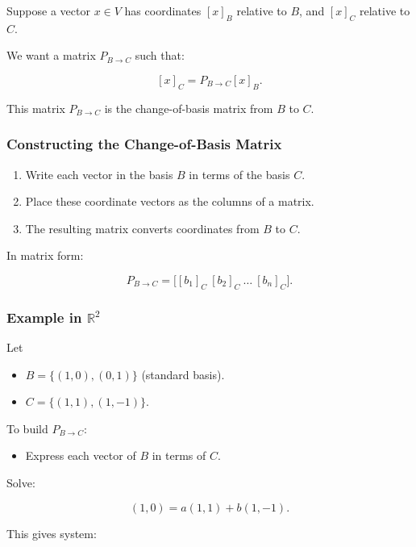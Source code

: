 \documentclass[
  letterpaper,
  DIV=11,
  numbers=noendperiod]{scrreprt}
\providecommand{\tightlist}{%
  \setlength{\itemsep}{0pt}\setlength{\parskip}{0pt}}
\begin{document}
Suppose a vector \(x \in V\) has coordinates \([x]_B\) relative to
\(B\), and \([x]_C\) relative to \(C\).

We want a matrix \(P_{B \to C}\) such that:

\[
[x]_C = P_{B \to C} [x]_B.
\]

This matrix \(P_{B \to C}\) is the change-of-basis matrix from \(B\) to
\(C\).

\subsubsection{Constructing the Change-of-Basis
Matrix}\label{constructing-the-change-of-basis-matrix}

\begin{enumerate}
\def\labelenumi{\arabic{enumi}.}
\tightlist
\item
  Write each vector in the basis \(B\) in terms of the basis \(C\).
\item
  Place these coordinate vectors as the columns of a matrix.
\item
  The resulting matrix converts coordinates from \(B\) to \(C\).
\end{enumerate}

In matrix form:

\[
P_{B \to C} = \big[ [b_1]_C \ [b_2]_C \ \dots \ [b_n]_C \big].
\]

\subsubsection{\texorpdfstring{Example in
\(\mathbb{R}^2\)}{Example in \textbackslash mathbb\{R\}\^{}2}}\label{example-in-mathbbr2-2}

Let

\begin{itemize}
\tightlist
\item
  \(B = \{(1,0), (0,1)\}\) (standard basis).
\item
  \(C = \{(1,1), (1,-1)\}\).
\end{itemize}

To build \(P_{B \to C}\):

\begin{itemize}
\tightlist
\item
  Express each vector of \(B\) in terms of \(C\).
\end{itemize}

Solve:

\[
(1,0) = a(1,1) + b(1,-1).
\]

This gives system:
\end{document}
